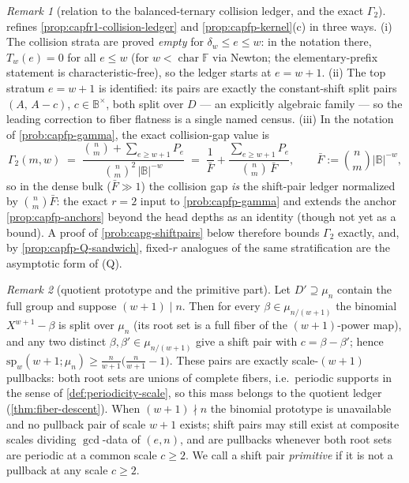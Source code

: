 \documentclass[11pt]{article}
\theoremstyle{definition}
\theoremstyle{remark}
\newtheorem{remark}[remark]{Remark}
\newcommand{\F}{\mathbb{F}}
\newcommand{\B}{\mathbb{B}}
\begin{document}
\begin{remark}[relation to the balanced-ternary collision ledger, and
the exact $\Gamma_2$]\label{rem:capg-secondmom-rel}
 refines
\cref{prop:capfr1-collision-ledger} and
\cref{prop:capfp-kernel}\textup{(c)} in three ways.  \textup{(i)}  The
collision strata are proved \emph{empty} for
$\delta_w\le e\le w$: in the notation there, $T_w(e)=0$ for all
$e\le w$ (for $w<\operatorname{char}\F$ via Newton; the
elementary-prefix statement is characteristic-free), so the ledger
starts at $e=w+1$.  \textup{(ii)}  The top stratum $e=w+1$ is
identified: its pairs are exactly the constant-shift split pairs
$(A,\,A-c)$, $c\in\B^{\times}$, both split over $D$ --- an explicitly
algebraic family --- so the leading correction to fiber flatness is a
single named census.  \textup{(iii)}  In the notation of
\cref{prob:capfp-gamma}, the exact collision-gap value is
\[
        \Gamma_2(m,w)
        \;=\;
        \frac{\binom nm+\sum_{e\ge w+1}P_e}
             {\binom nm^{2}\,|\B|^{-w}}
        \;=\;
        \frac1{\bar F}
        +\frac{\sum_{e\ge w+1}P_e}{\binom nm\,\bar F},
        \qquad
        \bar F:=\binom nm|\B|^{-w},
\]
so in the dense bulk ($\bar F\gg1$) the collision gap \emph{is} the
shift-pair ledger normalized by $\binom nm\bar F$: the exact $r=2$ input
to
\cref{prob:capfp-gamma} and extends the anchor
\cref{prop:capfp-anchors} beyond the head depths as an identity (though
not yet as a bound).  A proof of \cref{prob:capg-shiftpairs} below
therefore bounds $\Gamma_2$ exactly, and, by
\cref{prop:capfp-Q-sandwich}, fixed-$r$ analogues of the same
stratification are the asymptotic form of \textup{(Q)}.
\end{remark}

\begin{remark}[quotient prototype and the primitive part]\label{rem:capg-prototype}
Let $D'\supseteq\mu_n$ contain the full group and suppose $(w+1)\mid n$.
Then for every $\beta\in\mu_{n/(w+1)}$ the binomial $X^{w+1}-\beta$ is split
over $\mu_n$ (its root set is a full fiber of the $(w+1)$-power map), and
any two distinct $\beta,\beta'\in\mu_{n/(w+1)}$ give a shift pair with
$c=\beta-\beta'$; hence
$\mathrm{sp}_w(w+1;\mu_n)\geq \tfrac{n}{w+1}\big(\tfrac{n}{w+1}-1\big)$.
These pairs are exactly scale-$(w+1)$ pullbacks: both root sets are unions
of complete fibers, i.e.\ periodic supports in the sense of
\cref{def:periodicity-scale}, so this mass belongs to the quotient ledger
(\cref{thm:fiber-descent}).  When $(w+1)\nmid n$ the binomial prototype is
unavailable and no pullback pair of scale $w+1$ exists; shift pairs may
still exist at composite scales dividing $\gcd$-data of $(e,n)$, and are
pullbacks whenever both root sets are periodic at a common scale
$c\geq 2$.  We call a shift pair \emph{primitive} if it is not a pullback at
any scale $c\geq 2$.
\end{remark}
\end{document}
